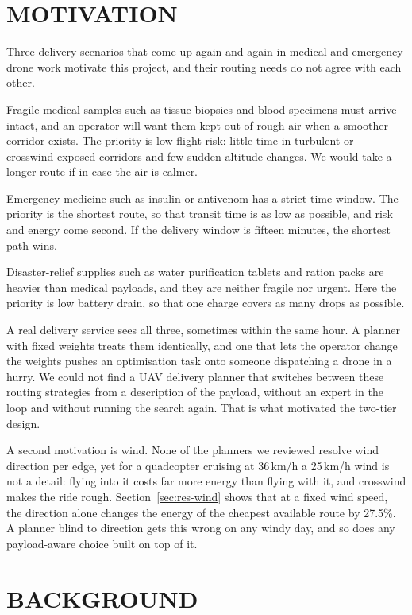 \section{MOTIVATION}

Three delivery scenarios that come up again and again in medical and emergency drone
work motivate this project, and their routing needs do not agree with each other.

Fragile medical samples such as tissue biopsies and blood specimens must arrive intact,
and an operator will want them kept out of rough air when a smoother corridor exists.
The priority is low flight risk: little time in turbulent or crosswind-exposed corridors
and few sudden altitude changes. We would take a longer route if in case the air is calmer.

Emergency medicine such as insulin or antivenom has a strict time window. The priority
is the shortest route, so that transit time is as low as possible, and risk and energy
come second. If the delivery window is fifteen minutes, the shortest path wins.

Disaster-relief supplies such as water purification tablets and ration packs are
heavier than medical payloads, and they are neither fragile nor urgent. Here the
priority is low battery drain, so that one charge covers as many drops as possible.

A real delivery service sees all three, sometimes within the same hour. A planner with
fixed weights treats them identically, and one that lets the operator change the weights
pushes an optimisation task onto someone dispatching a drone in a hurry. We could not
find a UAV delivery planner that
switches between these routing strategies from a description of the payload, without
an expert in the loop and without running the search again. That is what motivated the
two-tier design.

A second motivation is wind. None of the planners we reviewed resolve wind direction
per edge, yet for a quadcopter cruising at 36\,km/h a 25\,km/h wind is not a detail:
flying into it costs far more energy than flying with it, and crosswind makes the ride
rough.
Section~\ref{sec:res-wind} shows that at a fixed wind speed, the direction alone changes
the energy of the cheapest available route by 27.5\%. A planner blind to direction gets this
wrong on any windy day, and so does any payload-aware choice built on top of it.

\section{BACKGROUND}\label{sec:background}


